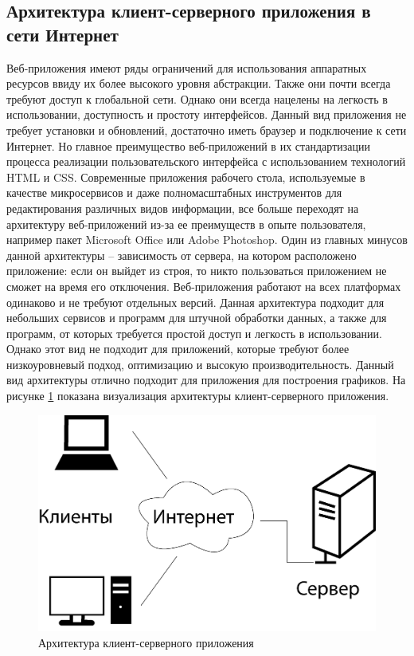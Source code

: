 \subsection{Архитектура клиент-серверного приложения в сети Интернет}
Веб-приложения имеют ряды ограничений для использования аппаратных ресурсов ввиду их более высокого уровня абстракции. Также они почти всегда требуют доступ к глобальной сети. Однако они всегда нацелены на легкость в использовании, доступность и простоту интерфейсов. Данный вид приложения не требует установки и обновлений, достаточно иметь браузер и подключение к сети Интернет. Но главное преимущество веб-приложений в их стандартизации процесса реализации пользовательского интерфейса с использованием технологий HTML и CSS. Современные приложения рабочего стола, используемые в качестве микросервисов и даже полномасштабных инструментов для редактирования различных видов информации, все больше переходят на архитектуру веб-приложений из-за ее преимуществ в опыте пользователя, например пакет Microsoft Office или Adobe Photoshop. Один из главных минусов данной архитектуры -- зависимость от сервера, на котором расположено приложение: если он выйдет из строя, то никто пользоваться приложением не сможет на время его отключения. Веб-приложения работают на всех платформах одинаково и не требуют отдельных версий. Данная архитектура подходит для небольших сервисов и программ для штучной обработки данных, а также для программ, от которых требуется простой доступ и легкость в использовании. Однако этот вид не подходит для приложений, которые требуют более низкоуровневый подход, оптимизацию и высокую производительность. Данный вид архитектуры отлично подходит для приложения для построения графиков. На рисунке \ref{fig:4} показана визуализация архитектуры клиент-серверного приложения.

\begin{figure}[h!]
    \center
    \includegraphics[scale=1]{fig/arc.png}
    \caption{Архитектура клиент-серверного приложения}
    \label{fig:4}
\end{figure}

